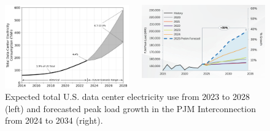 \documentclass[aspectratio=169]{beamer}
\begin{document}
    \begin{frame}
        \begin{figure}
            \begin{columns}
                \begin{column}{0.5\textwidth}
                    \includegraphics[width=\linewidth]{images/2024-united-states-data-center-energy-usage-report}
                \end{column}
                \begin{column}{0.5\textwidth}
                    \includegraphics[width=\linewidth]{images/pjm-peak-load-growth-forecast}
                \end{column}
            \end{columns}
            \caption{Expected total U.S. data center electricity use from 2023 to 2028 (left) and forecasted peak load growth in the PJM Interconnection from 2024 to 2034 (right).}
        \end{figure}
    \end{frame}
\end{document}
